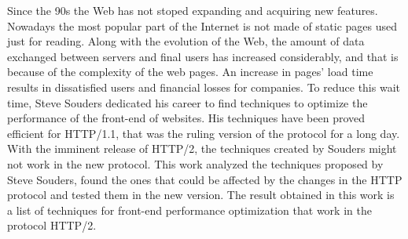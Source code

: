 %
%

\begin{resumo}[Abstract]

Since the 90s the Web has not stoped expanding and acquiring new features. Nowadays the most popular part of the Internet is not made of static pages used just for reading. Along with the evolution of the Web, the amount of data exchanged between servers and final users has increased considerably, and that is because of the complexity of the web pages. An increase in pages' load time results in dissatisfied users and financial losses for companies. To reduce this wait time, Steve Souders dedicated his career to find techniques to optimize the performance of the front-end of websites. His techniques have been proved efficient for HTTP/1.1, that was the ruling version of the protocol for a long day. With the imminent release of HTTP/2, the techniques created by Souders might not work in the new protocol. This work analyzed the techniques proposed by Steve Souders, found the ones that could be affected by the changes in the HTTP protocol and tested them in the new version. The result obtained in this work is a list of techniques for front-end performance optimization that work in the protocol HTTP/2. 

\end{resumo}
